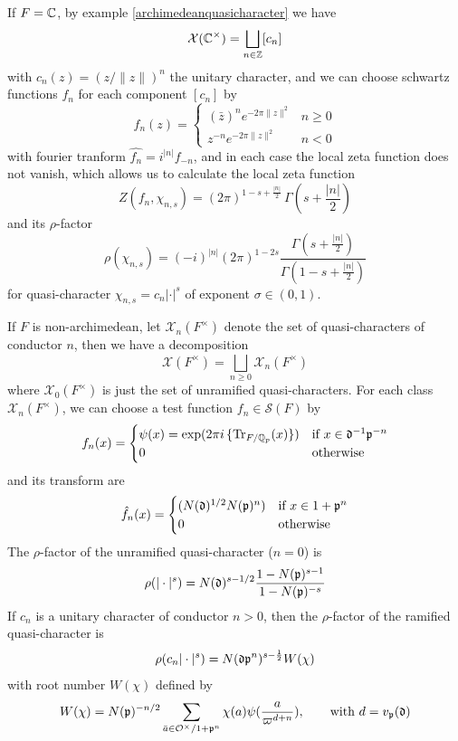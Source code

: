\begin{example}
    If \(F = \mathbb{C}\), by example \ref{archimedeanquasicharacter} we have
    \[\mathcal{X}(\mathbb{C}^\times) = \bigsqcup_{n \in \mathbb{Z}} [c_n]\]
    with \(c_n(z) = (z/\|z\|)^n\) the unitary character, and we can choose schwartz functions \(f_n\) for each component \([c_n]\) by 
    \[f_n(z) = \begin{cases}
        (\bar{z})^n e^{-2\pi \|z\|^2} & n \geq 0 \\
        z^{-n} e^{-2\pi \|z\|^2} & n < 0
    \end{cases}\]
    with fourier tranform \(\hat{f_n} = i^{|n|}f_{-n}\), and in each case the local zeta function does not vanish, which allows us to calculate the local zeta function
    \[Z(f_n,\chi_{n,s}) = (2\pi)^{1-s+\frac{|n|}{2}} \, \Gamma(s+ \frac{|n|}{2})\]
    and its \(\rho\)-factor
    \[\rho(\chi_{n,s}) = (-i)^{|n|}(2\pi)^{1-2s} \frac{\Gamma(s+\frac{|n|}{2})}{\Gamma(1-s+\frac{|n|}{2})}\]
    for quasi-character \(\chi_{n,s} = c_n |\cdot|^s\) of exponent \(\sigma \in (0,1)\).
\end{example}

\begin{example}
    If \(F\) is non-archimedean, let \(\mathcal{X}_n(F^\times)\) denote the set of quasi-characters of conductor \(n\), then we have a decomposition
    \[\mathcal{X}(F^\times) = \bigsqcup_{n \geq 0} \mathcal{X}_n(F^\times)\]
    where \(\mathcal{X}_0(F^\times)\) is just the set of unramified quasi-characters. For each class \(\mathcal{X}_n(F^\times)\), we can choose a test function \(f_n \in \mathcal{S}(F)\) by
    \[f_n(x) = \begin{cases}
        \psi(x) = \exp (2 \pi i \, \{\mathrm{Tr}_{F/\mathbb{Q}_p}(x)\}) & \text{if } x \in \mathfrak{d}^{-1}\mathfrak{p}^{-n} \\
        0 & \text{otherwise}
    \end{cases}\]
    and its transform are 
        \[\hat{f}_n(x) = \begin{cases}
        (N(\mathfrak{d})^{1/2} N(\mathfrak{p})^n)  & \text{if } x \in 1+ \mathfrak{p}^n \\
        0 & \text{otherwise}
    \end{cases}\]
The \(\rho\)-factor of the unramified quasi-character (\(n = 0\)) is 
    \[\rho(|\cdot|^s) = N(\mathfrak{d})^{s-1/2}\frac{1-N(\mathfrak{p})^{s-1}}{1-N(\mathfrak{p})^{-s}}\]
    If \(c_n\) is a unitary character of conductor \(n > 0\), then the \(\rho\)-factor of the ramified quasi-character is 
    \[\rho(c_n|\cdot|^s) = N(\mathfrak{d} \mathfrak{p}^n)^{s-\frac{1}{2}} W(\chi)\]
    with root number \(W(\chi)\) defined by
    \[W(\chi) = N(\mathfrak{p})^{-n/2} \sum_{\bar{a} \in \mathcal{O}^\times/1+\mathfrak{p}^n } \chi(a) \psi(\frac{a}{\varpi^{d+n}}), \qquad \text{with } d = v_{\mathfrak{p}}(\mathfrak{d})\]

\end{example}

